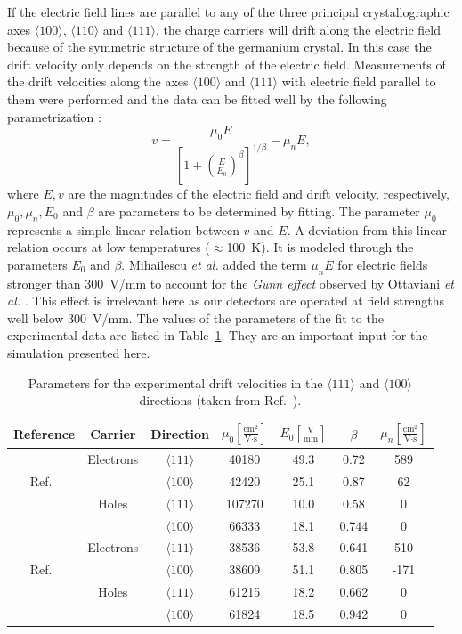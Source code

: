If the electric field lines are parallel to any of the three principal
crystallographic axes $\langle 100 \rangle$, $\langle 110 \rangle$ and
$\langle 111 \rangle$, the charge carriers will drift along the
electric field because of the symmetric structure of the germanium
crystal. In this case the drift velocity only depends on the strength
of the electric field. Measurements of the drift velocities along the
axes $\langle 100 \rangle$ and $\langle 111 \rangle$ with electric
field parallel to them were performed and the data can be fitted well
by the following parametrization \cite{Kno99}:
\begin{equation} 
\label{eq:pss:para} 
v = \frac{\mu_{0}E}{[1+(\frac{E}{E_{0}})^{\beta}]^{1/\beta}} - \mu_{n}E, 
\end{equation} 
where $E, v$ are the magnitudes of the electric field and drift
velocity, respectively, $\mu_{0}, \mu_{n}, E_{0}$ and $\beta$ are
parameters to be determined by fitting. The parameter $\mu_{0}$
represents a simple linear relation between $v$ and $E$. A deviation
from this linear relation occurs at low temperatures
($\approx$100~K). It is modeled through the parameters $E_{0}$ and
$\beta$. Mihailescu \textit{et al.} \cite{miha} added the term
$\mu_{n}E$ for electric fields stronger than 300~V/mm to account for
the \emph{Gunn effect} observed by Ottaviani \textit{et al.}
\cite{otta}. This effect is irrelevant here as our detectors are
operated at field strengths well below 300~V/mm. The values of the
parameters of the fit to the experimental data are listed in
Table~\ref{tab:pss:pars}. They are an important input for the
simulation presented here.
 
\begin{table}[tbhp] 
\centering 
\caption{Parameters for the experimental drift velocities in the 
$\langle111\rangle$ and $\langle 100 \rangle$ directions 
(taken from Ref.~\cite{bart}).} 
\label{tab:pss:pars}
\begin{tabular*}{\textwidth}{ccccccc}\hline\hline 
Reference & Carrier & Direction & $\mu_{0} \left[ \frac{\mbox{cm}^{2}}{\mbox{V}\cdot\mbox{s}} \right]$ & $E_{0} \left[ \frac{\mbox{V}}{\mbox{mm}} \right]$ & $\beta$ & $\mu_{n} \left[ \frac{\mbox{cm}^{2}}{\mbox{V}\cdot\mbox{s}} \right]$ \\\hline 
& Electrons & $\langle111\rangle$ & 40180 & 49.3 & 0.72 & 589 \\ 
Ref.~\cite{miha}& & $\langle100\rangle$ & 42420 & 25.1 & 0.87 & 62\\ 
& Holes & $\langle111\rangle$ & 107270 & 10.0 & 0.58 & 0 \\ 
& & $\langle100\rangle$ & 66333 & 18.1 & 0.744 & 0 \\\hline 
& Electrons & $\langle111\rangle$ & 38536 & 53.8 & 0.641 & 510 \\ 
Ref.~\cite{bart}& & $\langle100\rangle$ & 38609 & 51.1 & 0.805 & -171\\  
& Holes & $\langle111\rangle$ & 61215 & 18.2 & 0.662 & 0 \\ 
& & $\langle100\rangle$ & 61824 & 18.5 & 0.942 & 0 \\\hline\hline 
\end{tabular*} 
\end{table} 
 
